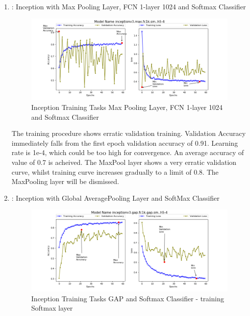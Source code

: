 \documentclass{IEEEtran}
\begin{document}
\begin{enumerate}

\item: Inception with Max Pooling Layer, FCN 1-layer 1024 and Softmax Classifier


\begin{figure}[H]
\centering
\label{fig:incv3-sm}
\includegraphics[scale=0.6]{images/t1-i3-fc1k-sm-4.png}
\caption{Inception Training Tasks Max Pooling Layer, FCN 1-layer 1024 and Softmax Classifier}
\end{figure}

The training procedure shows erratic validation training. Validation Accuracy immediately falls from the first epoch validation accuracy of 0.91. Learning rate is 1e-4, which could be too high for convergence. An average accuracy of value of 0.7 is acheived. The MaxPool layer shows a very erratic validation curve, whilst training curve increases gradually to a limit of 0.8. The MaxPooling layer will be dismissed.

\item: Inception with Global AveragePooling Layer and SoftMax Classifier
\begin{figure}[H]
\centering
\label{fig:incv3-gap-4}
\includegraphics[scale=0.6]{images/t1-i3-gap-sm-4.png}
\caption{Inception Training Tasks GAP and Softmax Classifier - training Softmax layer}
\end{figure}


\end{enumerate}
\end{document}
